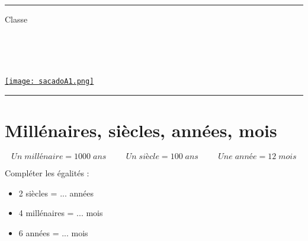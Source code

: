 \documentclass[a4paper,dvipsnames]{article}
\begin{document}

\fancyhead[C]{}
\hrule\medskip %
\begin{minipage}{0.295\textwidth} 
\raggedright
Classe \myClasse \hfill\\
\myDiscipline \hfill\\
\myParcours \hfill\\
\end{minipage}
\begin{minipage}{0.4\textwidth} 
\centering 
\scshape\huge
\textcolor{sacado_purple}{\myTitle} \\ 
\normalsize 
\end{minipage}
\begin{minipage}{0.295\textwidth} 
\raggedleft
\href{https://sacado.xyz/}{\texttt{[image: sacadoA1.png]}}
\end{minipage}
\medskip \hrule
\bigskip


\section{Millénaires, siècles, années, mois}

\begin{Def}
\[Un\;millénaire = 1000 \;ans \hspace{1cm} Un\; siècle = 100\; ans \hspace{1cm} Une\; année = 12 \;mois\]
\end{Def}

\begin{ExOApp}[]
Compléter les égalités :
\begin{itemize}
\item 2 siècles = ... années
\item 4 millénaires = ... mois
\item 6 années = ... mois
\end{itemize}
\end{ExOApp}
\end{document}
